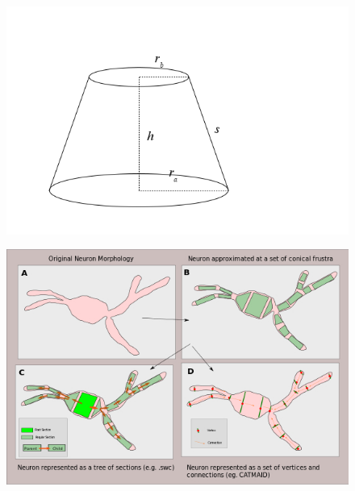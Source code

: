\documentclass[notes=hide]{beamer}
\begin{document}
{\begin{frame}
\begin{itemize}
\begin{figure}
\includegraphics[scale=0.175]{conical_frustum_equation.png}
\end{figure}

\begin{figure}
\includegraphics[scale=0.3]{new_morphology_original.jpg}
\end{figure}
\cite{rahim2012curve}
\end{itemize}


\end{frame}


}
\end{document}
